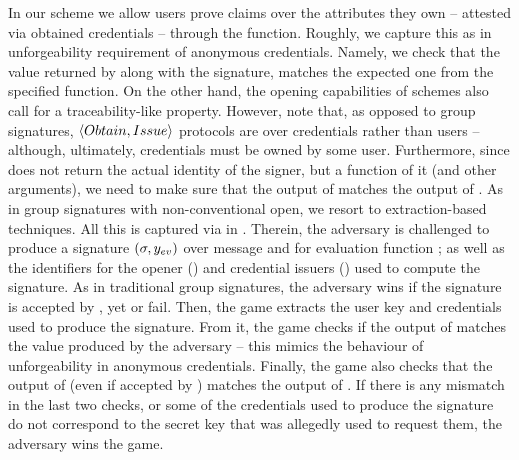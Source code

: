 In our \UAS scheme we allow users prove claims over the attributes they
own -- attested via obtained credentials -- through the \feval function.
Roughly, we capture this as in unforgeability requirement of anonymous
credentials. Namely, we check that the \yeval value returned by \Sign along with
the signature, matches the expected one from the specified \feval function.
On the other hand, the opening capabilities of \UAS schemes also call for a
traceability-like property. However, note that, as opposed to group signatures,
$\langle Obtain,Issue \rangle$ protocols are over credentials rather than
users -- although, ultimately, credentials must be owned by some user.
Furthermore, since \Open
does not return the actual identity of the signer, but a function \finsp of it
(and other arguments), we need to make sure that the output of \Open
matches the output of \finsp. As in group signatures with non-conventional open,
we resort to extraction-based techniques. All this is captured via \ExpForgeSign
in . Therein, the adversary is challenged to
produce a signature $(\sigma,y_{ev})$ over message \msg and for evaluation
function \feval; as well as the identifiers for the opener (\oid) and
credential issuers (\siid) used to compute the signature. As in traditional
group signatures, the adversary wins if the signature is accepted by \Verify,
yet \Open or \Judge fail. Then, the game extracts the user key and
credentials used to produce the signature. From it, the game checks if the
output of \feval matches the \yeval value produced by the adversary -- this
mimics the behaviour of unforgeability in anonymous credentials. Finally, the
game also checks that the output of \Open (even if accepted by \Judge)
matches the output of \finsp. If there is any mismatch in the last two checks,
or some of the credentials used to produce the signature do not correspond to
the secret key that was allegedly used to request them, the adversary wins the
game.


